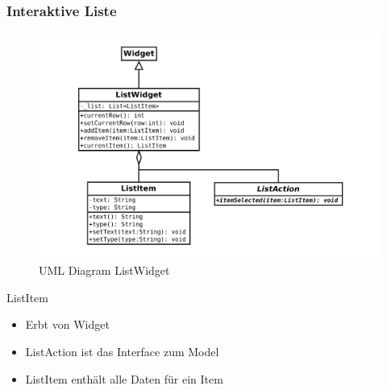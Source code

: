 \begin{frame}
	\frametitle{Interaktive Liste}
%
	\begin{minipage}{0.49\textwidth}
		\begin{figure}
			\centering
			\includegraphics[width = \textwidth]{../grafiken/uml-list-widget}
			\caption{UML Diagram ListWidget}
		\end{figure}
	\end{minipage}
%
	\begin{minipage}{0.44\textwidth}
		\begin{block}{ListItem}
			\begin{itemize}
			    \item Erbt von Widget
			    \item ListAction ist das Interface zum Model
			    \item ListItem enthält alle Daten für ein Item
			\end{itemize}
		\end{block}
	\end{minipage}
\end{frame}
